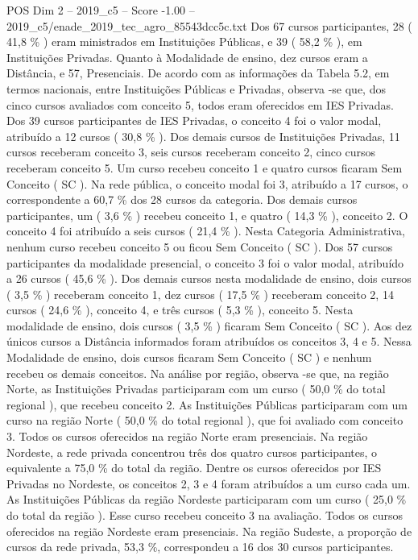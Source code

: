 \begin{textsample}{POS Dim 2 – 2019\_c5 – Score -1.00 – 2019\_c5/enade\_2019\_tec\_agro\_85543dcc5c.txt}
Dos 67 cursos participantes, 28 ( 41,8 \% ) eram ministrados em Instituições Públicas, e 39 ( 58,2 \% ), em Instituições Privadas.
Quanto à Modalidade de ensino, dez cursos eram a Distância, e 57, Presenciais.
De acordo com as informações da Tabela 5.2, em termos nacionais, entre Instituições Públicas e Privadas, observa -se que, dos cinco cursos avaliados com conceito 5, todos eram oferecidos em IES Privadas.
Dos 39 cursos participantes de IES Privadas, o conceito 4 foi o valor modal, atribuído a 12 cursos ( 30,8 \% ).
Dos demais cursos de Instituições Privadas, 11 cursos receberam conceito 3, seis cursos receberam conceito 2, cinco cursos receberam conceito 5.
Um curso recebeu conceito 1 e quatro cursos ficaram Sem Conceito ( SC ).
Na rede pública, o conceito modal foi 3, atribuído a 17 cursos, o correspondente a 60,7 \% dos 28 cursos da categoria.
Dos demais cursos participantes, um ( 3,6 \% ) recebeu conceito 1, e quatro ( 14,3 \% ), conceito 2.
O conceito 4 foi atribuído a seis cursos ( 21,4 \% ).
Nesta Categoria Administrativa, nenhum curso recebeu conceito 5 ou ficou Sem Conceito ( SC ).
Dos 57 cursos participantes da modalidade presencial, o conceito 3 foi o valor modal, atribuído a 26 cursos ( 45,6 \% ).
Dos demais cursos nesta modalidade de ensino, dois cursos ( 3,5 \% ) receberam conceito 1, dez cursos ( 17,5 \% ) receberam conceito 2, 14 cursos ( 24,6 \% ), conceito 4, e três cursos ( 5,3 \% ), conceito 5.
Nesta modalidade de ensino, dois cursos ( 3,5 \% ) ficaram Sem Conceito ( SC ).
Aos dez únicos cursos a Distância informados foram atribuídos os conceitos 3, 4 e 5.
Nessa Modalidade de ensino, dois cursos ficaram Sem Conceito ( SC ) e nenhum recebeu os demais conceitos.
Na análise por região, observa -se que, na região Norte, as Instituições Privadas participaram com um curso ( 50,0 \% do total regional ), que recebeu conceito 2.
As Instituições Públicas participaram com um curso na região Norte ( 50,0 \% do total regional ), que foi avaliado com conceito 3.
Todos os cursos oferecidos na região Norte eram presenciais.
Na região Nordeste, a rede privada concentrou três dos quatro cursos participantes, o equivalente a 75,0 \% do total da região.
Dentre os cursos oferecidos por IES Privadas no Nordeste, os conceitos 2, 3 e 4 foram atribuídos a um curso cada um.
As Instituições Públicas da região Nordeste participaram com um curso ( 25,0 \% do total da região ).
Esse curso recebeu conceito 3 na avaliação.
Todos os cursos oferecidos na região Nordeste eram presenciais.
Na região Sudeste, a proporção de cursos da rede privada, 53,3 \%, correspondeu a 16 dos 30 cursos participantes.

\end{textsample}
